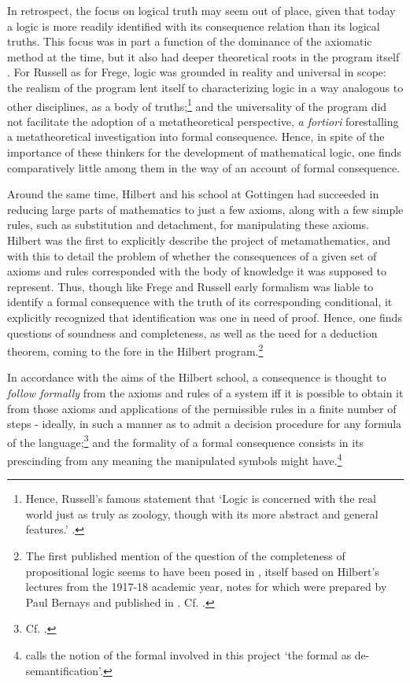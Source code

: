 \documentclass[]{article}
\begin{document}
In retrospect, the focus on logical truth may seem out of place, given that today a logic is more readily identified with its consequence relation than its logical truths. This focus was in part a function of the dominance of the axiomatic method at the time, but it also had deeper theoretical roots in the program itself \cite{vanHeijenoort1967}. For Russell as for Frege, logic was grounded in reality and universal in scope: the realism of the program lent itself to characterizing logic in a way analogous to other disciplines, as a body of truths;\footnote{Hence, Russell's famous statement that `Logic is concerned with the real world just as truly as zoology, though with its more abstract and general features.' \cite[169]{Russell1919}.} and the universality of the program did not facilitate the adoption of a metatheoretical perspective, \textit{a fortiori} forestalling a metatheoretical investigation into formal consequence. Hence, in spite of the importance of these thinkers for the development of mathematical logic, one finds comparatively little among them in the way of an account of formal consequence.

Around the same time, Hilbert and his school at Gottingen had succeeded in reducing large parts of mathematics to just a few axioms, along with a few simple rules, such as substitution and detachment, for manipulating these axioms. Hilbert was the first to explicitly describe the project of metamathematics, and with this to detail the problem of whether the consequences of a given set of axioms and rules corresponded with the body of knowledge it was supposed to represent. Thus, though like Frege and Russell early formalism was liable to identify a formal consequence with the truth of its corresponding conditional, it explicitly recognized that identification was one in need of proof. Hence, one finds questions of soundness and completeness, as well as the need for a deduction theorem, coming to the fore in the Hilbert program.\footnote{The first published mention of the question of the completeness of propositional logic seems to have been posed in \cite{Hilbert1928}, itself based on Hilbert's lectures from the 1917-18 academic year, notes for which were prepared by Paul Bernays and published in \cite{Ewald2011}. Cf. \cite{Franks2010}.}

In accordance with the aims of the Hilbert school, a consequence is thought to \textit{follow formally} from the axioms and rules of a system iff it is possible to obtain it from those axioms and applications of the permissible rules in a finite number of steps - ideally, in such a manner as to admit a decision procedure for any formula of the language;\footnote{Cf. \cite[354]{Franks2010}.} and the formality of a formal consequence consists in its prescinding from any meaning the manipulated symbols might have.\footnote{\cite{DutilhNovaes2011} calls the notion of the formal involved in this project `the formal as de-semantification'.}
\end{document}
